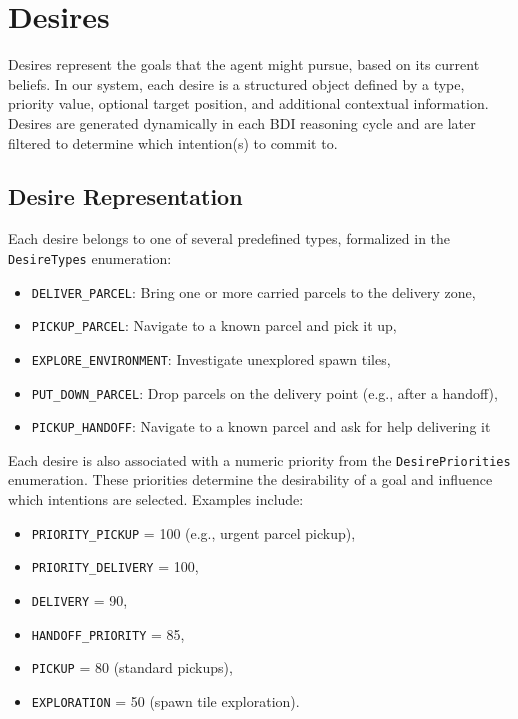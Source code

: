 \section{Desires}

Desires represent the goals that the agent might pursue, based on its current beliefs. In our system, each desire is a structured object defined by a type, priority value, optional target position, and additional contextual information. Desires are generated dynamically in each BDI reasoning cycle and are later filtered to determine which intention(s) to commit to.

\subsection{Desire Representation}

Each desire belongs to one of several predefined types, formalized in the \texttt{DesireTypes} enumeration:

\begin{itemize}
    \item \texttt{DELIVER\_PARCEL}: Bring one or more carried parcels to the delivery zone,
    \item \texttt{PICKUP\_PARCEL}: Navigate to a known parcel and pick it up,
    \item \texttt{EXPLORE\_ENVIRONMENT}: Investigate unexplored spawn tiles,
    \item \texttt{PUT\_DOWN\_PARCEL}: Drop parcels on the delivery point (e.g., after a handoff),
    \item \texttt{PICKUP\_HANDOFF}: Navigate to a known parcel and ask for help delivering it
\end{itemize}

Each desire is also associated with a numeric priority from the \texttt{DesirePriorities} enumeration. These priorities determine the desirability of a goal and influence which intentions are selected. Examples include:

\begin{itemize}
    \item \texttt{PRIORITY\_PICKUP} = 100 (e.g., urgent parcel pickup),
    \item \texttt{PRIORITY\_DELIVERY} = 100,
    \item \texttt{DELIVERY} = 90,
    \item \texttt{HANDOFF\_PRIORITY} = 85,
    \item \texttt{PICKUP} = 80 (standard pickups),
    \item \texttt{EXPLORATION} = 50 (spawn tile exploration).
\end{itemize}

